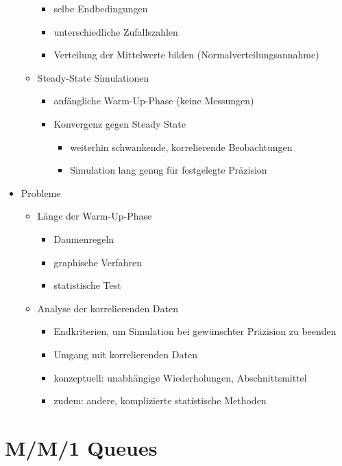 \documentclass[nonacm=true, language=german]{acmart}
\begin{document}
\begin{itemize}
\begin{itemize}
\begin{itemize}
            \item selbe Endbedingungen
            \item unterschiedliche Zufallszahlen
            \item Verteilung der Mittelwerte bilden (Normalverteilungsannahme)
        \end{itemize}
        \item Steady-State Simulationen
        \begin{itemize}
            \item anfängliche Warm-Up-Phase (keine Messungen)
            \item Konvergenz gegen Steady State
            \begin{itemize}
                \item weiterhin schwankende, korrelierende Beobachtungen
                \item Simulation lang genug für festgelegte Präzision
            \end{itemize}
        \end{itemize}
    \end{itemize}
    \item Probleme
    \begin{itemize}
        \item Länge der Warm-Up-Phase
        \begin{itemize}
            \item Daumenregeln
            \item graphische Verfahren
            \item statistische Test
        \end{itemize}
        \item Analyse der korrelierenden Daten
        \begin{itemize}
            \item Endkriterien, um Simulation bei gewünschter Präzision zu beenden
            \item Umgang mit korrelierenden Daten
            \item konzeptuell: unabhängige Wiederholungen, Abschnittsmittel
            \item zudem: andere, komplizierte statistische Methoden
        \end{itemize}
    \end{itemize}
\end{itemize}

\newpage

\section{M/M/1 Queues}
\end{document}
